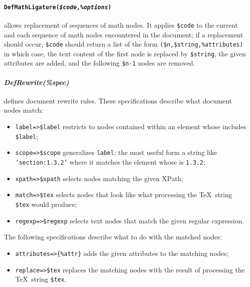 \documentclass{book}
\newcommand{\ltxcode}{\lstinline[style=inlinelatexml]}
\begin{document}
\paragraph[DefMathLigature]{%
    \texttt{DefMathLigature(\textit{\$code},\textit{\%options})}}
allows replacement of sequences of math nodes.
It applies \ltxcode|$code| to the current 
and each sequence of math nodes encountered in the document; if a replacement should
occur, \ltxcode|$code| should return a list of the form \ltxcode|($n,$string,%
in which case, the text content of the first node is replaced by \ltxcode|$string|,
the given attributes are added, and the following \ltxcode|$n-1| nodes are removed.

\paragraph[DefRewrite]{%
  \textit{DefRewrite(\textit{\%spec})}}
defines document rewrite rules. These specifications describe what document nodes match:
\begin{itemize}
\item \ltxcode|label=>$label| restricts to nodes contained within an element whose
   includes \ltxcode|$label|;
\item \ltxcode|scope=>$scope| generalizes \texttt{label}; the most useful form
 a string like \texttt{'section:1.3.2'} where it matches the 
  element whose  is \texttt{1.3.2};
\item \ltxcode|xpath=>$xpath| selects nodes matching the given XPath;
\item \ltxcode|match=>$tex| selects nodes that look like what processing
 the \TeX\ string \ltxcode|$tex| would produce;
\item \ltxcode|regexp=>$regexp| selects text nodes that match the given regular expression.
\end{itemize}
The following specifications describe what to do with the matched nodes:
\begin{itemize}
\item \ltxcode|attributes=>{%
\item \ltxcode|replace=>$tex| replaces the matching nodes with the result
of processing the \TeX\ string \ltxcode|$tex|.
\end{itemize}
\end{document}
